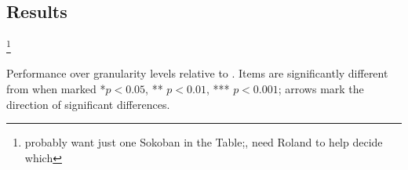 \subsection{Results}
\footnote{probably want just one Sokoban in the Table;, need Roland to help decide which}


\begin{table}[t]
\footnotesize
  \caption{Performance over granularity levels relative to \tloA{}. Items are significantly different from \tloA{} when marked *$p<0.05$, ** $p <0.01$, *** $p<0.001$; arrows mark the direction of significant differences.}
  \label{tab:granularity_significance}
\begin{adjustbox}{width=\columnwidth}

\end{adjustbox}
\end{table}



